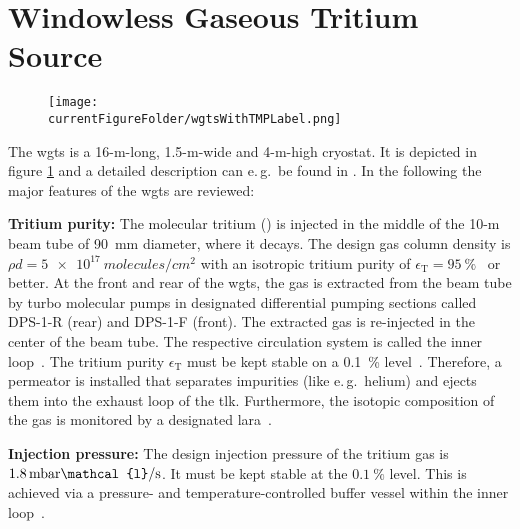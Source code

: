 \section{Windowless Gaseous Tritium Source}
\label{sec:katrinExpSetupWGTS}
\begin{figure}
    \centering    \texttt{[image: \\currentFigureFolder/wgtsWithTMPLabel.png]}
    \label{fig:katrinExpSetupWGTS}
\end{figure}%
The \gls{wgts} is a 16-m-long, 1.5-m-wide and 4-m-high cryostat. It is depicted in figure \ref{fig:katrinExpSetupWGTS} and a detailed description can e.\,g.~be found in \cite{Grohman2008,Babutzka2012}. In the following the major features of the \gls{wgts} are reviewed:

{\par\textbf{Tritium purity:} 
The molecular tritium () is injected in the middle of the 10-m beam tube of \SI{90}{mm} diameter, where it decays. The design gas column density is $\rho d = \SI{5e17}{molecules/{cm}^2}$ with an isotropic tritium purity of $\epsilon_\text{T} = \SI{95}{\percent}$~\cite{Angrik:2005ep} or better. At the front and rear of the \gls{wgts}, the gas is extracted from the beam tube by turbo molecular pumps in designated differential pumping sections called DPS-1-R (rear) and DPS-1-F (front). The extracted gas is re-injected in the center of the beam tube. The respective circulation system is called the inner loop~\cite{PRIESTER201542}. The tritium purity $\epsilon_\text{T}$ must be kept stable on a \SI{0.1}{\percent} level~\cite{Angrik:2005ep}. Therefore, a permeator is installed that separates impurities (like e.\,g.~helium) and ejects them into the exhaust loop of the \gls{tlk}. Furthermore, the isotopic composition of the gas
is monitored by a designated \gls{lara}~\cite{Schloesser2013}.}

{\par\textbf{Injection pressure:}
The design injection pressure of the tritium gas is $1.8\text{\,mbar}\mathcal{l}/\text{s}$. It must be kept stable at the $\SI{0.1}{\percent}$ level. This is achieved via a pressure- and temperature-controlled buffer vessel within the inner loop~\cite{PRIESTER201542}.}


